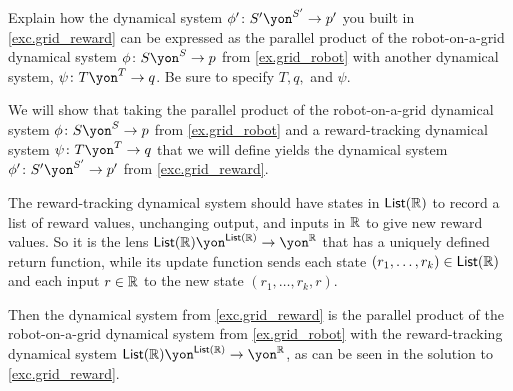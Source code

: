 \documentclass[Book-Poly]{subfiles}
\begin{document}
\begin{exercise} \label{exc.grid_reward_par}
Explain how the dynamical system $\phi'\colon S'\yon^{S'}\to p'$ you built in \cref{exc.grid_reward} can be expressed as the parallel product of the robot-on-a-grid dynamical system $\phi\colon S\yon^S\to p$ from \cref{ex.grid_robot} with another dynamical system, $\psi\colon T\yon^T\to q$.
Be sure to specify $T, q,$ and $\psi$.
\begin{solution}
We will show that taking the parallel product of the robot-on-a-grid dynamical system $\phi\colon S\yon^S\to p$ from \cref{ex.grid_robot} and a reward-tracking dynamical system $\psi\colon T\yon^T\to q$ that we will define yields the dynamical system $\phi'\colon S'\yon^{S'}\to p'$ from \cref{exc.grid_reward}.

The reward-tracking dynamical system should have states in $\mathsf{List}(\mathbb{R})$ to record a list of reward values, unchanging output, and inputs in $\mathbb{R}$ to give new reward values.
So it is the lens $\lst(\rr)\yon^{\lst(\rr)}\to\yon^\rr$ that has a uniquely defined return function, while its update function sends each state $(r_1,\ldots,r_k)\in\mathsf{List}(\mathbb{R})$ and each input $r\in\mathbb{R}$ to the new state $(r_1,\ldots,r_k,r)$.

Then the dynamical system from \cref{exc.grid_reward} is the parallel product of the robot-on-a-grid dynamical system from \cref{ex.grid_robot} with the reward-tracking dynamical system $\lst(\rr)\yon^{\lst(\rr)}\to\yon^\rr$, as can be seen in the solution to \cref{exc.grid_reward}.
\end{solution}
\end{exercise}
\end{document}
